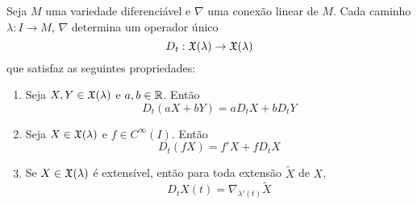 \begin{proposicao}\label{derivada-covariante-de-um-caminho}
	Seja $M$ uma variedade diferenciável e
	$\nabla$ uma conexão linear de $M$.
	Cada caminho $\lambda: I \rightarrow M$, $\nabla$ determina um operador único
	\begin{equation*}
		D_t: \mathfrak{X}(\lambda) \rightarrow \mathfrak{X}(\lambda)
	\end{equation*}
	que satisfaz as seguintes propriedades:
	\begin{enumerate}
		\item Seja $X,Y \in \mathfrak{X}(\lambda)$ e $a,b \in \mathbb R$. Então
		\begin{equation*}
			D_t(aX + bY) = a D_t X + b D_t Y
		\end{equation*}
		\item Seja $X \in \mathfrak{X}(\lambda)$ e $f \in C^{\infty}(I)$. Então
		\begin{equation*}
			D_t(fX) = f' X + f D_t X
		\end{equation*}
		\item Se $X \in \mathfrak{X}(\lambda)$ é extensível, então para toda extensão $\tilde{X}$ de $X$,
		\begin{equation*}
			D_t X(t) = \nabla_{\lambda'(t)} \tilde{X}
		\end{equation*}
	\end{enumerate}
\end{proposicao}

